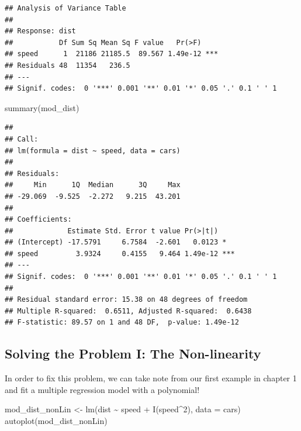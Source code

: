 \documentclass[
]{book}
\newenvironment{Shaded}{\begin{snugshade}}{\end{snugshade}}
\newcommand{\AttributeTok}[1]{\textcolor[rgb]{0.77,0.63,0.00}{#1}}
\newcommand{\DecValTok}[1]{\textcolor[rgb]{0.00,0.00,0.81}{#1}}
\newcommand{\FunctionTok}[1]{\textcolor[rgb]{0.00,0.00,0.00}{#1}}
\newcommand{\NormalTok}[1]{#1}
\newcommand{\OtherTok}[1]{\textcolor[rgb]{0.56,0.35,0.01}{#1}}
\newcommand{\SpecialCharTok}[1]{\textcolor[rgb]{0.00,0.00,0.00}{#1}}
\begin{document}
\begin{verbatim}
## Analysis of Variance Table
## 
## Response: dist
##           Df Sum Sq Mean Sq F value   Pr(>F)    
## speed      1  21186 21185.5  89.567 1.49e-12 ***
## Residuals 48  11354   236.5                     
## ---
## Signif. codes:  0 '***' 0.001 '**' 0.01 '*' 0.05 '.' 0.1 ' ' 1
\end{verbatim}

\begin{Shaded}
\begin{Highlighting}[]
\FunctionTok{summary}\NormalTok{(mod\_dist)}
\end{Highlighting}
\end{Shaded}

\begin{verbatim}
## 
## Call:
## lm(formula = dist ~ speed, data = cars)
## 
## Residuals:
##     Min      1Q  Median      3Q     Max 
## -29.069  -9.525  -2.272   9.215  43.201 
## 
## Coefficients:
##             Estimate Std. Error t value Pr(>|t|)    
## (Intercept) -17.5791     6.7584  -2.601   0.0123 *  
## speed         3.9324     0.4155   9.464 1.49e-12 ***
## ---
## Signif. codes:  0 '***' 0.001 '**' 0.01 '*' 0.05 '.' 0.1 ' ' 1
## 
## Residual standard error: 15.38 on 48 degrees of freedom
## Multiple R-squared:  0.6511, Adjusted R-squared:  0.6438 
## F-statistic: 89.57 on 1 and 48 DF,  p-value: 1.49e-12
\end{verbatim}

\hypertarget{solving-the-problem-i-the-non-linearity}{%
\subsection{Solving the Problem I: The Non-linearity}\label{solving-the-problem-i-the-non-linearity}}

In order to fix this problem, we can take note from our first example in chapter 1 and fit a multiple regression model with a polynomial!

\begin{Shaded}
\begin{Highlighting}[]
\NormalTok{mod\_dist\_nonLin }\OtherTok{\textless{}{-}} \FunctionTok{lm}\NormalTok{(dist }\SpecialCharTok{\textasciitilde{}}\NormalTok{ speed }\SpecialCharTok{+} \FunctionTok{I}\NormalTok{(speed}\SpecialCharTok{\^{}}\DecValTok{2}\NormalTok{), }\AttributeTok{data =}\NormalTok{ cars)}
\FunctionTok{autoplot}\NormalTok{(mod\_dist\_nonLin)}
\end{Highlighting}
\end{Shaded}
\end{document}
